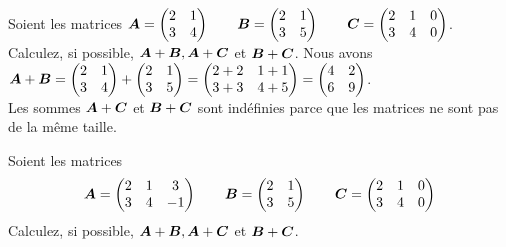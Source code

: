 \begin{exemple}
    Soient les matrices $\displaystyle
    \boldsymbol{A} = \begin{pmatrix}
        2 & 1 \\
        3 & 4
        \end{pmatrix}
    \qquad
    \boldsymbol{B} = \begin{pmatrix}
        2 & 1 \\
        3 & 5
        \end{pmatrix}
        \qquad
    \boldsymbol{C} = \begin{pmatrix}
        2 & 1 & 0\\
        3 & 4 & 0
        \end{pmatrix}
    $.\\[5pt]
    Calculez, si possible, $\boldsymbol{A}+\boldsymbol{B}, \boldsymbol{A}+\boldsymbol{C}$ et $\boldsymbol{B}+\boldsymbol{C}$.
    \solution
    Nous avons $\displaystyle
    \boldsymbol{A}+\boldsymbol{B} = \begin{pmatrix}
                2 & 1\\
                3 & 4
                \end{pmatrix} + 
                \begin{pmatrix}
                2 & 1\\
                3 & 5
                \end{pmatrix} = \begin{pmatrix}
                2+2 & 1+1\\
                3+3 & 4+5
                \end{pmatrix} = \begin{pmatrix}
            4 & 2\\
            6 & 9
            \end{pmatrix}
    $.\\[5pt]   
    Les sommes $\boldsymbol{A}+\boldsymbol{C}$ et $\boldsymbol{B}+\boldsymbol{C}$ sont indéfinies parce que les matrices ne
    sont pas de la même taille.
\end{exemple}


\begin{exerciceB}
    Soient les matrices{\small
    \[
    \boldsymbol{A} = \begin{pmatrix}
        2 & 1 & 3\\
        3 & 4 & -1
        \end{pmatrix}
    \qquad
    \boldsymbol{B} = \begin{pmatrix}
        2 & 1 \\
        3 & 5
        \end{pmatrix}
        \qquad
    \boldsymbol{C} = \begin{pmatrix}
        2 & 1 & 0\\
        3 & 4 & 0
        \end{pmatrix}
    \]
    }
    Calculez, si possible, $\boldsymbol{A}+\boldsymbol{B}, \boldsymbol{A}+\boldsymbol{C}$ et $\boldsymbol{B}+\boldsymbol{C}$.
\end{exerciceB}


